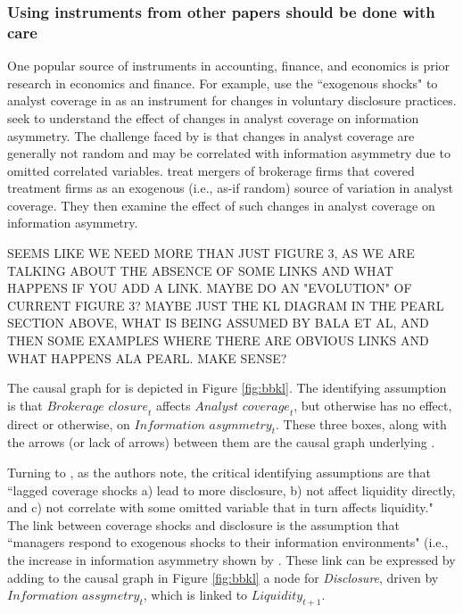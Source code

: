 \documentclass[11pt]{amsart}
\begin{document}
\subsubsection{Using instruments from other papers should be done with care}
One popular source of instruments in accounting, finance, and economics is prior research in economics and finance.
For example, \citet{Balakrishnan:2014js} use the ``exogenous shocks" to analyst coverage in \citet{Kelly:2012ih} as an instrument for changes in voluntary disclosure practices. 
\citet{Kelly:2012ih} seek to understand the effect of changes in analyst coverage on information asymmetry. 
The challenge faced by \citet{Kelly:2012ih} is that changes in analyst coverage are generally not random and may be correlated with information asymmetry due to omitted correlated variables.
\citet{Kelly:2012ih} treat mergers of brokerage firms that covered treatment firms as an exogenous (i.e., as-if random) source of variation in analyst coverage.%
They then examine the effect of such changes in analyst coverage on information asymmetry.


SEEMS LIKE WE NEED MORE THAN JUST FIGURE 3, AS WE ARE TALKING ABOUT THE ABSENCE OF SOME LINKS AND WHAT HAPPENS IF YOU ADD A LINK.  MAYBE DO AN "EVOLUTION" OF CURRENT FIGURE 3? MAYBE JUST THE KL DIAGRAM IN THE PEARL SECTION ABOVE, WHAT IS BEING ASSUMED BY BALA ET AL, AND THEN SOME EXAMPLES WHERE THERE ARE OBVIOUS LINKS AND WHAT HAPPENS ALA PEARL.  MAKE SENSE?


The causal graph for \citet{Kelly:2012ih} is depicted in Figure \ref{fig:bbkl}.
The identifying assumption is that $\textit{Brokerage closure}_t$ affects $\textit{Analyst coverage}_t$, but otherwise has no effect, direct or otherwise, on $\textit{Information asymmetry}_t$.
These three boxes, along with the arrows (or lack of arrows) between them are the causal graph underlying \citet{Kelly:2012ih}.

Turning to \citet{Balakrishnan:2014js}, as the authors note, the critical identifying assumptions are that ``lagged coverage shocks a) lead to more disclosure, b) not affect liquidity directly, and c) not correlate with some omitted variable that in turn affects liquidity." 
The link between coverage shocks and disclosure is the assumption that ``managers respond to exogenous shocks to their information environments" (i.e., the increase in information asymmetry shown by  \citet{Kelly:2012ih}.
These link can be expressed by adding to the causal graph in Figure \ref{fig:bbkl} a node for \textit{Disclosure}, driven by $\textit{Information assymetry}_t$, which is linked to $\textit{Liquidity}_{t+1}$.
\end{document}
